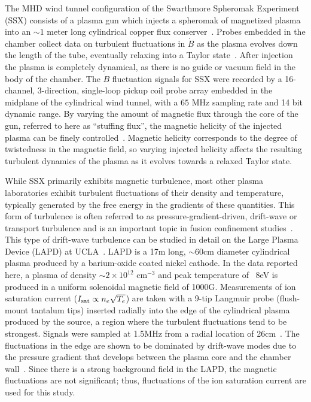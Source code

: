 \documentclass[aps,prx,twocolumn,secnumarabic,nobalancelastpage,amsmath,amssymb,
nofootinbib]{revtex4-1}
\begin{document}
The MHD wind tunnel configuration of the Swarthmore Spheromak Experiment (SSX) consists of a plasma gun which injects a spheromak of magnetized plasma into an $\sim1$ meter long cylindrical copper flux conserver~\cite{gray2013}. Probes embedded in the chamber collect data on turbulent fluctuations in $\dot{B}$ as the plasma evolves down the length of the tube, eventually relaxing into a Taylor state~\cite{gray2013,schaffner2014a,schaffner2014b,schaffner2014c}. After injection the plasma is completely dynamical, as there is no guide or vacuum field in the body of the chamber. The $\dot{B}$ fluctuation signals for SSX  were recorded by a 16-channel, 3-direction, single-loop pickup coil probe array embedded in the midplane of the cylindrical wind tunnel, with a $65$ MHz sampling rate and 14 bit dynamic range. By varying the amount of magnetic flux through the core of the gun, referred to here as ``stuffing flux'', the magnetic helicity of the injected plasma can be finely controlled~\cite{schaffner2014b}. Magnetic helicity corresponds to the degree of twistedness in the magnetic field, so varying injected helicity affects the resulting turbulent dynamics of the plasma as it evolves towards a relaxed Taylor state.

While SSX primarily exhibits magnetic turbulence, most other plasma laboratories exhibit turbulent fluctuations of their density and temperature, typically generated by the free energy in the gradients of these quantities. This form of turbulence is often referred to as pressure-gradient-driven, drift-wave or transport turbulence and is an important topic in fusion confinement studies~\cite{burrell1997}. This type of drift-wave turbulence can be studied in detail on the Large Plasma Device (LAPD) at UCLA~\cite{gekelman1991}. LAPD is a 17m long, $\sim$60cm diameter cylindrical plasma produced by a barium-oxide coated nickel cathode. In the data reported here, a plasma of density $\sim$$2 \times 10^{12}$ cm$^{-3}$ and peak temperature of ~8eV is produced in a uniform solenoidal magnetic field of 1000G. Measurements of ion saturation current ($I_{\rm sat} \propto n_e \sqrt{T_e}$) are taken with a 9-tip Langmuir probe (flush-mount tantalum tips) inserted radially into the edge of the cylindrical plasma produced by the source, a region where the turbulent fluctuations tend to be strongest. Signals were sampled at 1.5MHz from a radial location of 26cm~\cite{schaffner2012}. The fluctuations in the edge are shown to be dominated by drift-wave modes due to the pressure gradient that develops between the plasma core and the chamber wall~\cite{maggs1996}. Since there is a strong background field in the LAPD, the magnetic fluctuations are not significant; thus, fluctuations of the ion saturation current are used for this study.
\end{document}
